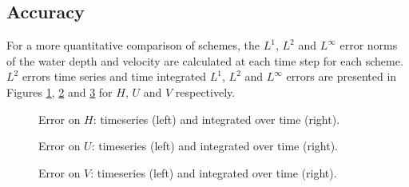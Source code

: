 \subsection{Accuracy}

For a more quantitative comparison of schemes, the $L^1$, $L^2$ and $L^\infty$
error norms of the water depth and velocity are calculated at each time step for
each scheme.
$L^2$ errors time series and time integrated $L^1$, $L^2$ and $L^\infty$ errors
are presented in Figures \ref{fig:thacker:ErrNumH}, \ref{fig:thacker:ErrNumU}
and \ref{fig:thacker:ErrNumV} for $H$, $U$ and $V$ respectively.

\begin{figure}[H]
\begin{minipage}[t]{0.45\textwidth}
 \centering
\end{minipage}
\begin{minipage}[t]{0.55\textwidth}
 \centering
\end{minipage}
  \caption{Error on $H$: timeseries (left) and integrated over time (right).}
  \label{fig:thacker:ErrNumH}
\end{figure}

\begin{figure}[H]
\begin{minipage}[t]{0.45\textwidth}
 \centering
\end{minipage}
\begin{minipage}[t]{0.55\textwidth}
 \centering
\end{minipage}
  \caption{Error on $U$: timeseries (left) and integrated over time (right).}
  \label{fig:thacker:ErrNumU}
\end{figure}

\begin{figure}[H]
\begin{minipage}[t]{0.45\textwidth}
 \centering
\end{minipage}
\begin{minipage}[t]{0.55\textwidth}
 \centering
\end{minipage}
  \caption{Error on $V$: timeseries (left) and integrated over time (right).}
  \label{fig:thacker:ErrNumV}
\end{figure}

